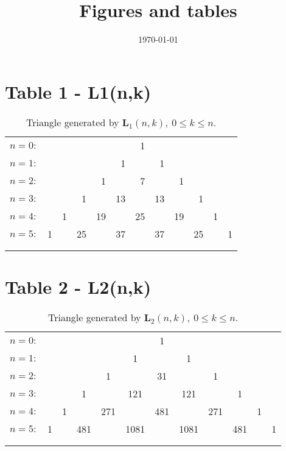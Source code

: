 \documentclass[12pt, letterpaper]{amsart}
\title{Figures and tables}
\date{\today}
\theoremstyle{definition}
\theoremstyle{remark}
\numberwithin{equation}{section}
\begin{document}
\maketitle

\section{Table 1 - L1(n,k)}
\begin{table}[H]
\centering
\begin{tabular}{lrrrrrrrrrrr}
$n=0:$&  &    &    &    &    &  1 &    &    &    &    &   \\\noalign{\smallskip\smallskip}
$n=1:$&  &    &    &    &  1 &    &  1 &    &    &    &   \\\noalign{\smallskip\smallskip}
$n=2:$&  &    &    &  1 &    &  7 &    &  1 &    &    &   \\\noalign{\smallskip\smallskip}
$n=3:$&  &    &  1 &    &  13 &    &  13 &    &  1 &    &   \\\noalign{\smallskip\smallskip}
$n=4:$&  &  1 &    &  19 &    &  25 &    &  19 &    &  1 &   \\\noalign{\smallskip\smallskip}
$n=5:$&1 &    &  25 &    & 37 &    & 37 &    &  25 &    & 1 \\\noalign{\smallskip\smallskip}
\\\noalign{\smallskip\smallskip}
\end{tabular}
\caption{Triangle generated by $\mathbf{L}_1(n,k), \ 0\leq k\leq n$.} \label{fig_1}
\end{table}
\section{Table 2 - L2(n,k)}
\begin{table}[H]
\begin{tabular}{rccccccccccc}
$n=0:$&  &    &    &    &    &  1 &    &    &    &    &   \\\noalign{\smallskip\smallskip}
$n=1:$&  &    &    &    &  1 &    &  1 &    &    &    &   \\\noalign{\smallskip\smallskip}
$n=2:$&  &    &    &  1 &    &  31 &    &  1 &    &    &   \\\noalign{\smallskip\smallskip}
$n=3:$&  &    &  1 &    &  121 &    &  121 &    &  1 &    &   \\\noalign{\smallskip\smallskip}
$n=4:$&  &  1 &    &  271 &    &  481 &    &  271 &    &  1 &   \\\noalign{\smallskip\smallskip}
$n=5:$&1 &    &  481 &    & 1081 &    & 1081 &    &  481 &    & 1 \\\noalign{\smallskip\smallskip}
\\\noalign{\smallskip\smallskip}
\end{tabular}
\caption{Triangle generated by $\mathbf{L}_2(n,k), \ 0\leq k\leq n$.} \label{fig_2}
\end{table}
\end{document}
